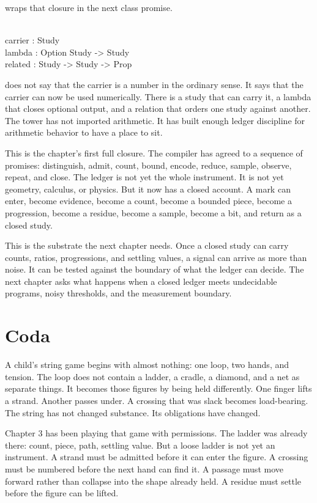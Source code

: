  wraps that closure in the next class promise.

\begin{leancode}
\\
carrier : Study\\
lambda : Option Study -> Study\\
related : Study -> Study -> Prop
\end{leancode}

 does not say that the carrier is a number in the ordinary
sense. It says that the carrier can now be used numerically. There is a study
that can carry it, a lambda that closes optional output, and a relation that
orders one study against another. The tower has not imported arithmetic. It has
built enough ledger discipline for arithmetic behavior to have a place to sit.

This is the chapter's first full closure. The compiler has agreed to a sequence
of promises: distinguish, admit, count, bound, encode, reduce, sample, observe,
repeat, and close. The ledger is not yet the whole instrument. It is not yet
geometry, calculus, or physics. But it now has a closed account. A mark can
enter, become evidence, become a count, become a bounded piece, become a
progression, become a residue, become a sample, become a bit, and return as a
closed study.

This is the substrate the next chapter needs. Once a closed study can carry
counts, ratios, progressions, and settling values, a signal can arrive as more
than noise. It can be tested against the boundary of what the ledger can decide.
The next chapter asks what happens when a closed ledger meets undecidable
programs, noisy thresholds, and the measurement boundary.

\section*{Coda}

A child's string game begins with almost nothing: one loop, two hands, and
tension. The loop does not contain a ladder, a cradle, a diamond, and a net as
separate things. It becomes those figures by being held differently. One finger
lifts a strand. Another passes under. A crossing that was slack becomes
load-bearing. The string has not changed substance. Its obligations have
changed.

Chapter 3 has been playing that game with permissions. The ladder was already
there: count, piece, path, settling value. But a loose ladder is not yet an
instrument. A strand must be admitted before it can enter the figure. A crossing
must be numbered before the next hand can find it. A passage must move forward
rather than collapse into the shape already held. A residue must settle before
the figure can be lifted.


